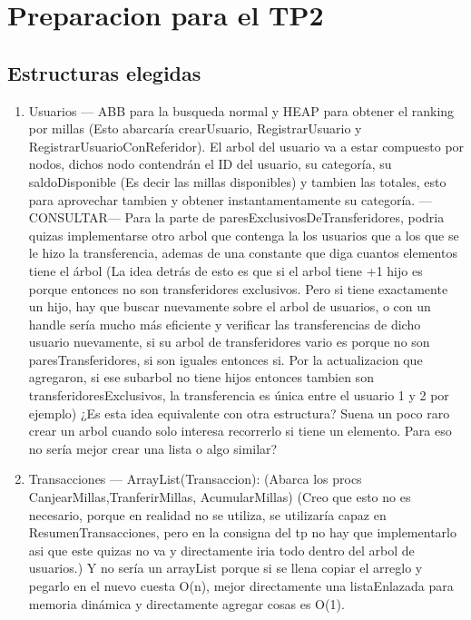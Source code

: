 \documentclass[11pt,a4paper]{article}
\begin{document}
\section{Preparacion para el TP2}
\vspace{1.0cm}

\subsection{Estructuras elegidas}

\begin{enumerate}
	\item Usuarios --- ABB para la busqueda normal y HEAP para obtener el ranking por millas (Esto abarcaría crearUsuario, RegistrarUsuario y RegistrarUsuarioConReferidor). El arbol del usuario va a estar compuesto por nodos, dichos nodo contendrán el ID del usuario, su categoría, su saldoDisponible (Es decir las millas disponibles) y tambien las totales, esto para aprovechar tambien y obtener instantamentamente su categoría. --- CONSULTAR--- Para la parte de paresExclusivosDeTransferidores, podria quizas implementarse otro arbol que contenga la los usuarios que a los que se le hizo la transferencia, ademas de una constante que diga cuantos elementos tiene el árbol (La idea detrás de esto es que si el arbol tiene +1 hijo es porque entonces no son transferidores exclusivos. Pero si tiene exactamente un hijo, hay que buscar nuevamente sobre el arbol de usuarios, o con un handle sería mucho más eficiente y verificar las transferencias de dicho usuario nuevamente, si su arbol de transferidores vario es porque no son paresTransferidores, si son iguales entonces si. Por la actualizacion que agregaron, si ese subarbol no tiene hijos entonces tambien son transferidoresExclusivos, la transferencia es única entre el usuario 1 y 2 por ejemplo) ¿Es esta idea equivalente con otra estructura? Suena un poco raro crear un arbol cuando solo interesa recorrerlo si tiene un elemento. Para eso no sería mejor crear una lista o algo similar? 
	\item Transacciones --- ArrayList(Transaccion): (Abarca los procs CanjearMillas,TranferirMillas, AcumularMillas) (Creo que esto no es necesario, porque en realidad no se utiliza, se utilizaría capaz en ResumenTransacciones, pero en la consigna del tp no hay que implementarlo asi que este quizas no va y directamente iria todo dentro del arbol de usuarios.) Y no sería un arrayList porque si se llena copiar el arreglo y pegarlo en el nuevo cuesta O(n), mejor directamente una listaEnlazada para memoria dinámica y directamente agregar cosas es O(1).

\end{enumerate}
\end{document}
